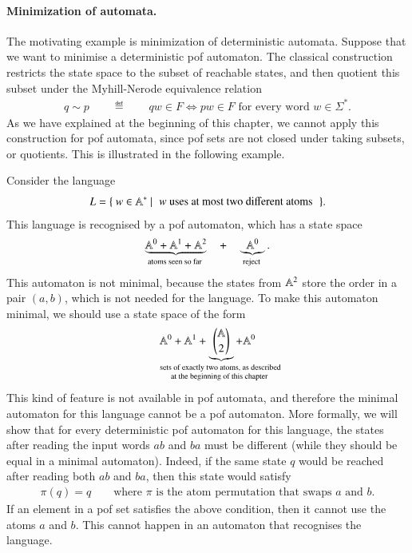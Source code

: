 \paragraph*{Minimization of automata.} The motivating example is  minimization of deterministic automata. Suppose that we want to minimise a deterministic pof automaton. The classical construction restricts the state space to  the subset of reachable states, and then quotient this subset under the Myhill-Nerode equivalence relation
\begin{align*}
q \sim p \qquad \eqdef \qquad qw \in F \Leftrightarrow pw \in F \text{ for every word $w \in \Sigma^*$}.
\end{align*}
As we have explained at the beginning of this chapter, we cannot apply this construction for pof automata,  since pof sets are not closed under taking subsets, or quotients. This is illustrated in the following example.

\begin{myexample}\label{ex:pof-dont-minimize}
    Consider the language
    \begin{align*}
    L = \setbuild{w \in \atoms^*}{\text{$w$ uses at most two different atoms}}.
    \end{align*}
    This language is recognised by a pof automaton, which has a state space 
    \begin{align*}
        \myunderbrace{\atoms^0+\atoms^1 + \atoms^2}{atoms seen so far}
        \quad + \quad 
        \myunderbrace{\atoms^0}{reject}.
    \end{align*}
    This automaton is not minimal, because the states from $\mathbb A^2$ store the order in a pair $(a,b)$, which is not needed for the language.
     To make this automaton minimal, we should use a state space of the form
    \begin{align*}
    \atoms^0 + \atoms^1 + 
    \myunderbrace{\atoms \choose 2}{sets of exactly two atoms, as described \\ at the beginning of this chapter } + \atoms^0
    \end{align*}
    This kind of feature is not available in pof automata, and therefore the minimal automaton for this language cannot be a pof automaton. More formally, we will show that for every deterministic pof automaton for this language, the states after reading the input words $ab$ and $ba$ must be different (while they should be equal in a minimal automaton). Indeed, if the same state $q$ would be reached after reading both $ab$ and $ba$,  then this state would satisfy 
    \begin{align*}
    \pi(q) = q \qquad \text{where $\pi$ is the atom permutation that swaps $a$ and $b$}.
    \end{align*}
    If an element in a pof set satisfies the above condition, then it cannot use the atoms $a$ and $b$. This cannot happen in an automaton that recognises the language.
\end{myexample}


